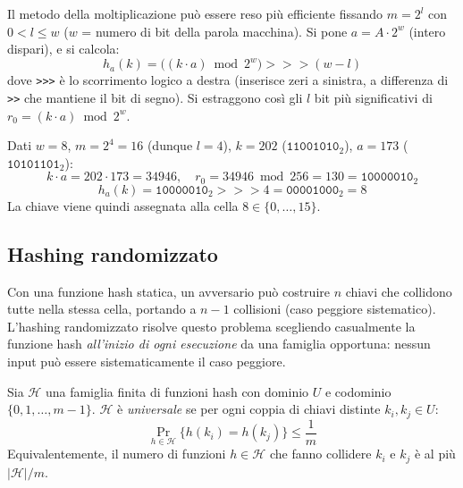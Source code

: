 Il metodo della moltiplicazione può essere reso più efficiente fissando
$m = 2^l$ con $0 < l \le w$ ($w$ = numero di bit della parola macchina).
Si pone $a = A \cdot 2^w$ (intero dispari), e si calcola:
\[
h_a(k) = \bigl((k \cdot a) \bmod 2^w\bigr) \mathbin{>>>} (w - l)
\]
dove \texttt{>>>} è lo scorrimento logico a destra (inserisce zeri a sinistra,
a differenza di \texttt{>>} che mantiene il bit di segno). Si estraggono così
gli $l$ bit più significativi di $r_0 = (k \cdot a) \bmod 2^w$.

\begin{esempio}[Moltiplica-e-scorri con $w=8$, $m=16$]
	Dati $w = 8$, $m = 2^4 = 16$ (dunque $l = 4$), $k = 202$
	($\mathtt{11001010}_2$), $a = 173$ ($\mathtt{10101101}_2$):
	\[
	k \cdot a = 202 \cdot 173 = 34946, \quad
	r_0 = 34946 \bmod 256 = 130 = \mathtt{10000010}_2
	\]
	\[
	h_a(k) = \mathtt{10000010}_2 \mathbin{>>>} 4 = \mathtt{00001000}_2 = 8
	\]
	La chiave viene quindi assegnata alla cella $8 \in \{0,\ldots,15\}$.
\end{esempio}

\subsection{Hashing randomizzato}

\begin{softnote}
	Con una funzione hash statica, un avversario può costruire $n$ chiavi che
	collidono tutte nella stessa cella, portando a $n-1$ collisioni (caso
	peggiore sistematico). L'hashing randomizzato risolve questo problema
	scegliendo casualmente la funzione hash \emph{all'inizio di ogni esecuzione}
	da una famiglia opportuna: nessun input può essere sistematicamente il caso
	peggiore.
\end{softnote}

\begin{definizione}
	Sia $\mathcal{H}$ una famiglia finita di funzioni hash con dominio $U$ e
	codominio $\{0,1,\ldots,m-1\}$. $\mathcal{H}$ è \emph{universale} se per
	ogni coppia di chiavi distinte $k_i, k_j \in U$:
	\[
	\Pr_{h \in \mathcal{H}}\bigl\{h(k_i) = h(k_j)\bigr\} \le \frac{1}{m}
	\]
	Equivalentemente, il numero di funzioni $h \in \mathcal{H}$ che fanno
	collidere $k_i$ e $k_j$ è al più $|\mathcal{H}|/m$.
\end{definizione}

